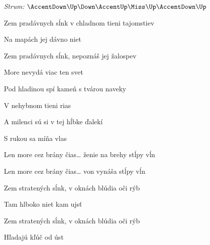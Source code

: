 \begin{song}


\begin{headerbox}
\RaiseBoxWithAccents
\textit{Strum:} $\AccentDown\Up\Down\AccentUp\Miss\Up\AccentDown\Up$
\end{headerbox}

\begin{vchordbox}
\end{vchordbox}

\large

\bigskip


Zem pradávnych sĺnk v chladnom tieni tajomstiev \par
Na mapách jej dávno niet \par
Zem pradávnych sĺnk, nepoznáš jej žalospev \par
More nevydá viac ten svet \par

\bigskip

Pod hladinou spí kameň s tvárou naveky \par
{}V nehybnom tieni rias \par
A milenci sú si v tej hĺbke ďalekí \par
{}S rukou sa míňa vlas \par

\bigskip

Len more cez brány čias… ženie na brehy stĺpy vĺn \par
Len more cez brány čias… von vynáša stĺpy vĺn \par

\bigskip

 \par

\bigskip

Zem stratených sĺnk, v oknách blúdia oči rýb \par
Tam hlboko niet kam ujsť \par
Zem stratených sĺnk, v oknách blúdia oči rýb \par
{}Hľadajú kľúč od úst \par


\end{song}
